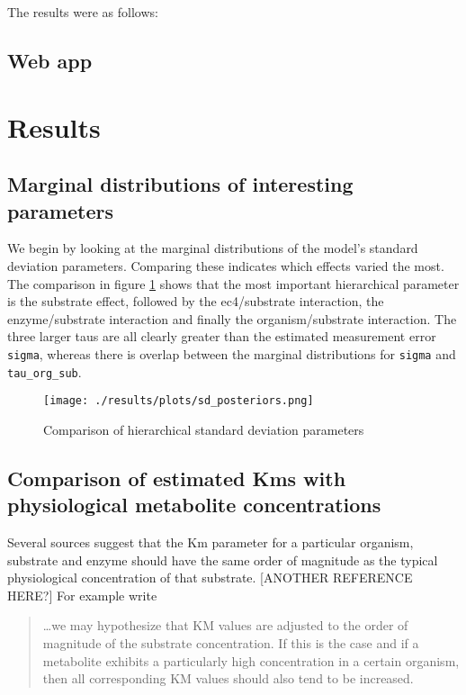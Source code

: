 \documentclass[11pt]{article}
\begin{document}
The results were as follows:

\subsection{Web app}
\label{sec:org2b5a253}
\section{Results}
\label{sec:orgb55063c}
\subsection{Marginal distributions of interesting parameters}
\label{sec:orgb4ce400}
We begin by looking at the marginal distributions of the model's standard
deviation parameters. Comparing these indicates which effects varied the
most. The comparison in figure \ref{fig:org2ba4151} shows that the most important
hierarchical parameter is the substrate effect, followed by the ec4/substrate
interaction, the enzyme/substrate interaction and finally the organism/substrate
interaction. The three larger taus are all clearly greater than the estimated
measurement error \texttt{sigma}, whereas there is overlap between the marginal
distributions for \texttt{sigma} and \texttt{tau\_org\_sub}.

\begin{figure}[htbp]
\centering
\texttt{[image: ./results/plots/sd\_posteriors.png]}
\caption{\label{fig:org2ba4151}Comparison of hierarchical standard deviation parameters}
\end{figure}

\subsection{Comparison of estimated Kms with physiological metabolite concentrations}
\label{sec:orgf7b0675}
Several sources suggest that the Km parameter for a particular organism,
substrate and enzyme should have the same order of magnitude as the typical
physiological concentration of that substrate. [ANOTHER REFERENCE HERE?] For example  write

\begin{quote}
\ldots{}we may hypothesize that KM values are adjusted to the order of magnitude of
the substrate concentration. If this is the case and if a metabolite exhibits a
particularly high concentration in a certain organism, then all corresponding KM
values should also tend to be increased.
\end{quote}
\end{document}
